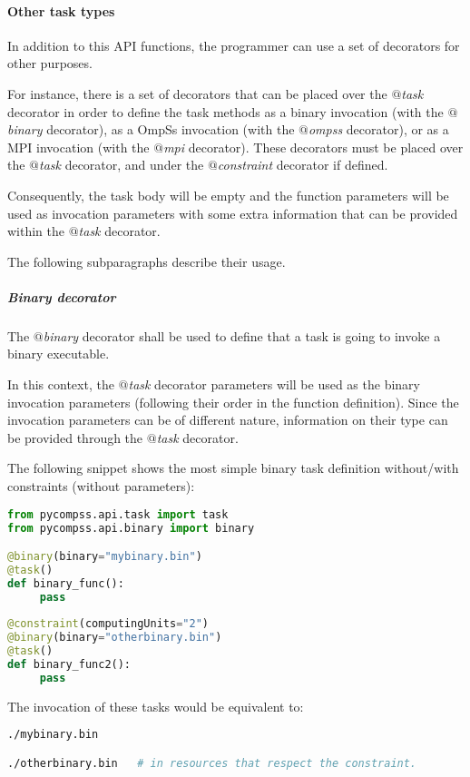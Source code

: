 \paragraph{Other task types}
\label{par:other_decorators}

In addition to this API functions, the programmer can use a set of decorators for other purposes.

For instance, there is a set of decorators that can be placed over the {\it $@$task} decorator in order to 
define the task methods as a binary invocation (with the {\it $@$binary} decorator), as a OmpSs invocation 
(with the {\it $@$ompss} decorator), or as a MPI invocation (with the {\it $@$mpi} decorator).
These decorators must be placed over the {\it $@$task} decorator, and under the {\it $@$constraint} decorator if 
defined.

Consequently, the task body will be empty and the function parameters will be used as invocation parameters
with some extra information that can be provided within the {\it $@$task} decorator.

The following subparagraphs describe their usage.

\subparagraph{Binary decorator}
\label{subpar:binary_decorator}

The {\it $@$binary} decorator shall be used to define that a task is going to invoke a binary executable.

In this context, the {\it $@$task} decorator parameters will be used as the binary invocation parameters
(following their order in the function definition). Since the invocation parameters can be of different nature, 
information on their type can be provided through the {\it $@$task} decorator.

The following snippet shows the most simple binary task definition without/with constraints (without parameters):

\begin{lstlisting}[language=python]
from pycompss.api.task import task
from pycompss.api.binary import binary

@binary(binary="mybinary.bin")
@task()
def binary_func():
     pass
     
@constraint(computingUnits="2")
@binary(binary="otherbinary.bin")
@task()
def binary_func2():
     pass
\end{lstlisting}

The invocation of these tasks would be equivalent to:

\begin{lstlisting}[language=bash]
./mybinary.bin 

./otherbinary.bin   # in resources that respect the constraint.
\end{lstlisting}

